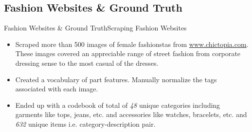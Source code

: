 \documentclass[10pt]{beamer}
\begin{document}
\subsection{Fashion Websites \& Ground Truth}
\begin{frame}{Fashion Websites \& Ground Truth}{Scraping Fashion Websites}
\begin{itemize}
\item Scraped more than 500 images of female fashionstas from \url{www.chictopia.com}. These images covered an appreciable range of street fashion from corporate dressing sense to the most casual of the dresses.
\pause
\item Created a vocabulary of part features. Manually normalize the tags associated with each image.
\pause
\item Ended up with a codebook of total of \textit{48} unique categories including garments like tops, jeans, etc. and accessories like watches, bracelets, etc. and \textit{632} unique items i.e. category-description pair.
\end{itemize}
\end{frame}
\end{document}
